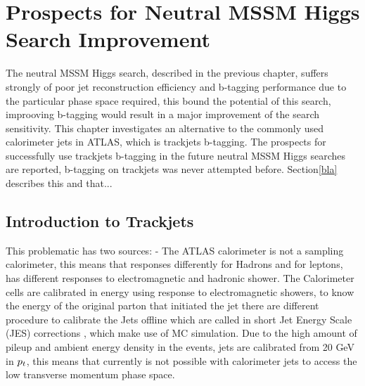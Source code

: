 \chapter{Prospects for Neutral MSSM Higgs Search Improvement}

The neutral MSSM Higgs search, described in the previous chapter, 
suffers strongly of poor jet reconstruction efficiency and  b-tagging performance due to the particular phase space
required, this bound the potential of this search, improoving b-tagging
would result in a major improvement of the search sensitivity. 
This chapter investigates an alternative to the commonly used calorimeter jets in ATLAS, 
which is trackjets b-tagging. 
The prospects for successfully use trackjets b-tagging in the future neutral MSSM Higgs searches are reported,
b-tagging on trackjets was never attempted before.
Section\ref{bla} describes this and that...


\clearpage

\section{Introduction to Trackjets} \label{sec:tj_intro}
This problematic has two sources:
- The ATLAS calorimeter is not a sampling calorimeter, this means that responses differently 
for Hadrons and for leptons, has different responses to electromagnetic and hadronic shower.
The Calorimeter cells are calibrated in energy using response to electromagnetic showers, to 
know the energy of the original parton that initiated the jet there are different procedure 
to calibrate the Jets offline which are called in short Jet Energy Scale (JES) corrections \cite{}, 
which make use of MC simulation.
Due to the high amount of pileup and ambient energy density in the events, jets are calibrated %
from 20 GeV in $p_{t}$, this means that currently is not possible with calorimeter jets to access the
low transverse momentum phase space.

